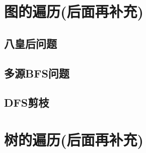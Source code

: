 \section{图的遍历(后面再补充)}

\subsection{八皇后问题}

\subsection{多源BFS问题}

\subsection{DFS剪枝}

\section{树的遍历(后面再补充)}
